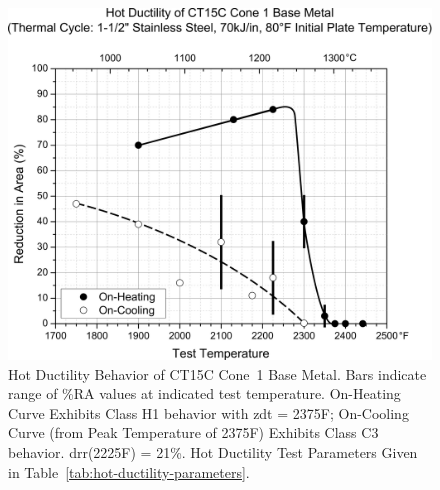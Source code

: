 \begin{figure}[h!]
\setlength{\abovecaptionskip}{15pt}
\centering
\includegraphics[width=6in]{figures/hot-ductility/c1-hot-ductility-curve.pdf}
\caption[Hot Ductility Behavior of Cone~1 Base Metal.]{Hot Ductility Behavior of CT15C Cone~1 Base Metal.  Bars indicate range of \%RA values at indicated test temperature.  On-Heating Curve Exhibits Class H1 behavior with \gls{zdt} = 2375\textdegree{}F; On-Cooling Curve (from Peak Temperature of 2375\textdegree{}F) Exhibits Class C3 behavior.  \gls{drr}(2225\textdegree{}F) = 21\%. Hot Ductility Test Parameters Given in Table~\ref{tab:hot-ductility-parameters}.}
\label{fig:c1-hot-ductility}
\end{figure}

